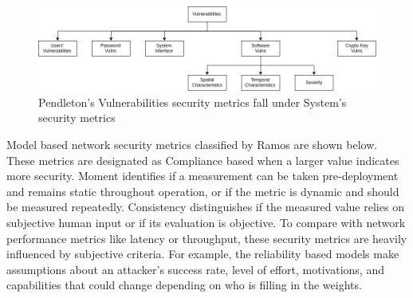 \begin{figure}[ht]
\centering
\includegraphics[width=.95\linewidth]{resource/img/ch_background/cybok_metrics/pendleton_vulns.png}
\caption{Pendleton’s Vulnerabilities security metrics fall under System’s security metrics
\label{fig:background:pendleton_vuln_metrics}}
\end{figure} 

Model based network security metrics classified by Ramos\cite{Ramos_Lazar_Filho_Rodrigues_2017} are shown below. These metrics are designated as Compliance based when a larger value indicates more security. Moment identifies if a measurement can be taken pre-deployment and remains static throughout operation, or if the metric is dynamic and should be measured repeatedly. Consistency distinguishes if the measured value relies on subjective human input or if its evaluation is objective. To compare with network performance metrics like latency or throughput, these security metrics are heavily influenced by subjective criteria. For example, the reliability based models make assumptions about an attacker’s success rate, level of effort, motivations, and capabilities that could change depending on who is filling in the weights. 

